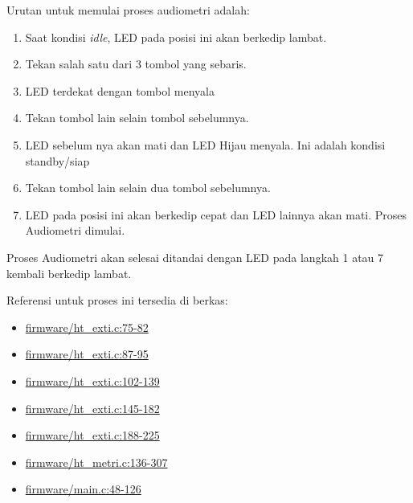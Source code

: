 \documentclass[12pt,]{article}
\begin{document}
	Urutan untuk memulai proses audiometri adalah:
	
	\begin{enumerate}
		\item Saat kondisi \textit{idle}, LED pada posisi ini akan berkedip lambat.
		
		\item Tekan salah satu dari 3 tombol yang sebaris.
		
		\item LED terdekat dengan tombol menyala
		
		\item Tekan tombol lain selain tombol sebelumnya.
		
		\item LED sebelum nya akan mati dan LED Hijau menyala.
		Ini adalah kondisi standby/siap
		
		\item Tekan tombol lain selain dua tombol sebelumnya.
		
		\item LED pada posisi ini akan berkedip cepat dan LED lainnya akan mati.
		Proses Audiometri dimulai.
		
	\end{enumerate}

	Proses Audiometri akan selesai ditandai dengan LED pada langkah 1 atau 7 kembali berkedip lambat.
	
	\newpage
	Referensi untuk proses ini tersedia di berkas:
	\begin{itemize}
		\item \href{https://github.com/VibrasticLab/pikoakustik/blob/stm32f401re_3pin/firmware/ht_exti.c#L75-L82}{firmware/ht\_exti.c:75-82}
		\item \href{https://github.com/VibrasticLab/pikoakustik/blob/stm32f401re_3pin/firmware/ht_exti.c#L87-L95}{firmware/ht\_exti.c:87-95}
		\item \href{https://github.com/VibrasticLab/pikoakustik/blob/stm32f401re_3pin/firmware/ht_exti.c#L102-L139}{firmware/ht\_exti.c:102-139}
		\item \href{https://github.com/VibrasticLab/pikoakustik/blob/stm32f401re_3pin/firmware/ht_exti.c#L145-L182}{firmware/ht\_exti.c:145-182}
		\item \href{https://github.com/VibrasticLab/pikoakustik/blob/stm32f401re_3pin/firmware/ht_exti.c#L188-L225}{firmware/ht\_exti.c:188-225}
		\item \href{https://github.com/VibrasticLab/pikoakustik/blob/stm32f401re_3pin/firmware/ht_metri.c#L136-L307}{firmware/ht\_metri.c:136-307}
		\item \href{https://github.com/VibrasticLab/pikoakustik/blob/stm32f401re_3pin/firmware/main.c#L48-L126}{firmware/main.c:48-126}
	\end{itemize}
\end{document}
